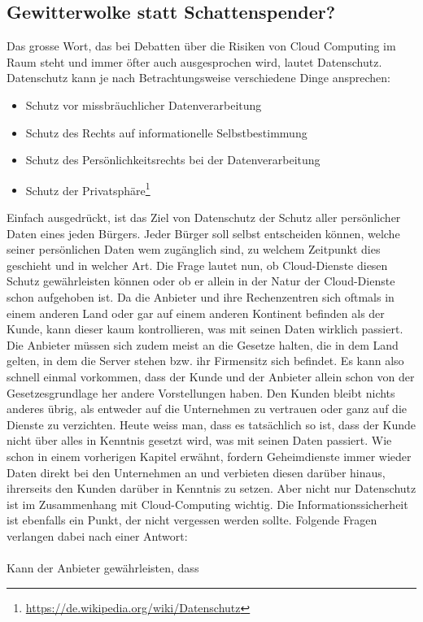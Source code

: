 \subsection{Gewitterwolke statt Schattenspender?}
Das grosse Wort, das bei Debatten über die Risiken von Cloud Computing im Raum steht und immer öfter auch ausgesprochen wird, lautet Datenschutz. Datenschutz kann je nach Betrachtungsweise verschiedene Dinge ansprechen:

\begin{itemize}
\item Schutz vor missbräuchlicher Datenverarbeitung
\item Schutz des Rechts auf informationelle Selbstbestimmung
\item Schutz des Persönlichkeitsrechts bei der Datenverarbeitung
\item Schutz der Privatsphäre\footnote{\url{https://de.wikipedia.org/wiki/Datenschutz}}
\end{itemize}

Einfach ausgedrückt, ist das Ziel von Datenschutz der Schutz aller persönlicher Daten eines jeden Bürgers. Jeder Bürger soll selbst entscheiden können, welche seiner persönlichen Daten wem zugänglich sind, zu welchem Zeitpunkt dies geschieht und in welcher Art. Die Frage lautet nun, ob Cloud-Dienste diesen Schutz gewährleisten können oder ob er allein in der Natur der Cloud-Dienste schon aufgehoben ist. Da die Anbieter und ihre Rechenzentren sich oftmals in einem anderen Land oder gar auf einem anderen Kontinent befinden als der Kunde, kann dieser kaum kontrollieren, was mit seinen Daten wirklich passiert. Die Anbieter müssen sich zudem meist an die Gesetze halten, die in dem Land gelten, in dem die Server stehen bzw. ihr Firmensitz sich befindet. Es kann also schnell einmal vorkommen, dass der Kunde und der Anbieter allein schon von der Gesetzesgrundlage her andere Vorstellungen haben. Den Kunden bleibt nichts anderes übrig, als entweder auf die Unternehmen zu vertrauen oder ganz auf die Dienste zu verzichten. Heute weiss man, dass es tatsächlich so ist, dass der Kunde nicht über alles in Kenntnis gesetzt wird, was mit seinen Daten passiert. Wie schon in einem vorherigen Kapitel erwähnt, fordern Geheimdienste immer wieder Daten direkt bei den Unternehmen an und verbieten diesen darüber hinaus, ihrerseits den Kunden darüber in Kenntnis zu setzen.
Aber nicht nur Datenschutz ist im Zusammenhang mit Cloud-Computing wichtig. Die Informationssicherheit ist ebenfalls ein Punkt, der nicht vergessen werden sollte. Folgende Fragen verlangen dabei nach einer Antwort:
\\
\\
Kann der Anbieter gewährleisten, dass

